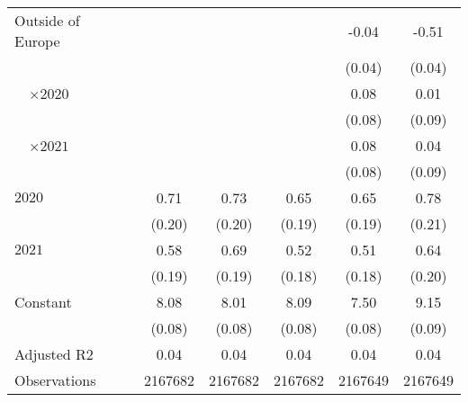 \begin{tabular}{@{}l*{5}{S[table-format={-}2.2{\tnote{***}}]}@{}}
Outside of Europe &  &  &  & -0.04 & -0.51\tnote{***}\tabularnewline%
 &  &  &  & (0.04) & (0.04)\tabularnewline%
~~\(\times 2020\) &  &  &  & 0.08 & 0.01\tabularnewline%
 &  &  &  & (0.08) & \vphantom{1} (0.09)\tabularnewline%
~~\(\times 2021\) &  &  &  & 0.08 & 0.04\tabularnewline%
 &  &  &  & (0.08) & (0.09)\tabularnewline%
\midrule
\(2020\) & 0.71\tnote{***} & 0.73\tnote{***} & 0.65\tnote{***} & 0.65\tnote{***} & 0.78\tnote{***}\tabularnewline%
 & (0.20) & (0.20) & (0.19) & (0.19) & (0.21)\tabularnewline%
\(2021\) & 0.58\tnote{**} & 0.69\tnote{***} & 0.52\tnote{**} & 0.51\tnote{**} & 0.64\tnote{**}\tabularnewline%
 & (0.19) & (0.19) & (0.18) & (0.18) & (0.20)\tabularnewline%
Constant & 8.08\tnote{***} & 8.01\tnote{***} & 8.09\tnote{***} & 7.50\tnote{***} & 9.15\tnote{***}\tabularnewline%
 & (0.08) & (0.08) & (0.08) & (0.08) & (0.09)\tabularnewline%
\midrule
Adjusted R2 & 0.04 & 0.04 & 0.04 & 0.04 & 0.04\tabularnewline%
Observations & {\num{2167682}} & {\num{2167682}} & {\num{2167682}} & {\num{2167649}} & {\num{2167649}}\tabularnewline%
\bottomrule
\end{tabular}
